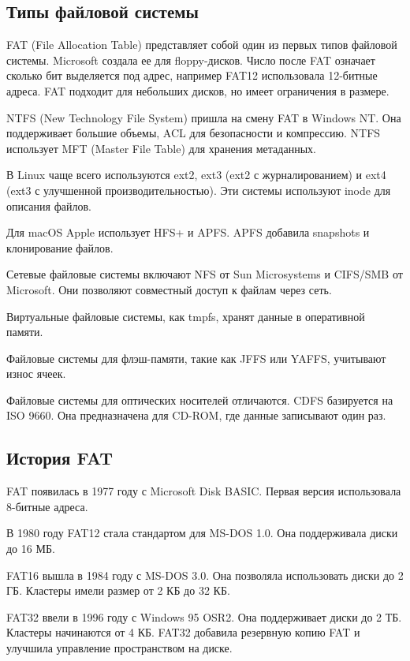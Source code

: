 \subsection{Типы файловой системы}

FAT (File Allocation Table) представляет собой один из первых типов файловой системы. Microsoft создала ее для floppy-дисков. Число после FAT означает сколько бит выделяется под адрес, например FAT12 использовала 12-битные адреса. FAT подходит для небольших дисков, но имеет ограничения в размере.

NTFS (New Technology File System) пришла на смену FAT в Windows NT. Она поддерживает большие объемы, ACL для безопасности и компрессию. NTFS использует MFT (Master File Table) для хранения метаданных.

В Linux чаще всего используются ext2, ext3 (ext2 с журналированием) и ext4 (ext3 с улучшенной производительностью). Эти системы используют inode для описания файлов.

Для macOS Apple использует HFS+ и APFS. APFS добавила snapshots и клонирование файлов.

Сетевые файловые системы включают NFS от Sun Microsystems и CIFS/SMB от Microsoft. Они позволяют совместный доступ к файлам через сеть.

Виртуальные файловые системы, как tmpfs, хранят данные в оперативной памяти.

Файловые системы для флэш-памяти, такие как JFFS или YAFFS, учитывают износ ячеек.

Файловые системы для оптических носителей отличаются. CDFS базируется на ISO 9660. Она предназначена для CD-ROM, где данные записывают один раз.

\subsection{История FAT}

FAT появилась в 1977 году с Microsoft Disk BASIC. Первая версия использовала 8-битные адреса.

В 1980 году FAT12 стала стандартом для MS-DOS 1.0. Она поддерживала диски до 16 МБ.

FAT16 вышла в 1984 году с MS-DOS 3.0. Она позволяла использовать диски до 2 ГБ. Кластеры имели размер от 2 КБ до 32 КБ.

FAT32 ввели в 1996 году с Windows 95 OSR2. Она поддерживает диски до 2 ТБ. Кластеры начинаются от 4 КБ. FAT32 добавила резервную копию FAT и улучшила управление пространством на диске.

